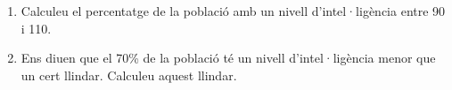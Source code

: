 \documentclass[11pt, a4paper, pdf]{book}
\begin{document}
\begin{mylist}
\begin{enumerate}
	\item Calculeu el percentatge de la població amb un nivell d'intel·ligència entre 90 i 110.
	
	\item Ens diuen que el 70\% de la població té un nivell d'intel·ligència menor que un cert llindar. Calculeu aquest llindar.
\end{enumerate}
\end{mylist}
\end{document}
